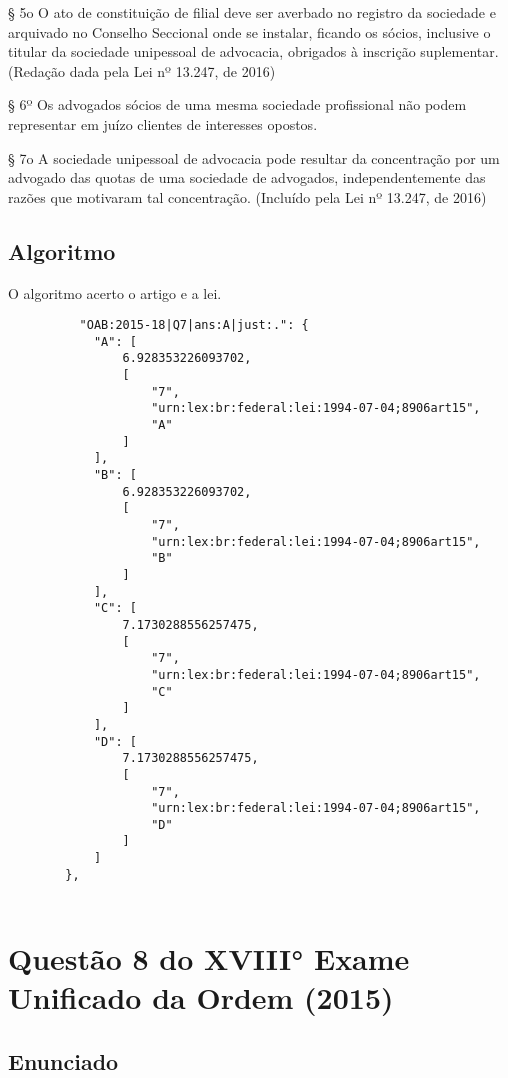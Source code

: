 \documentclass[12pt]{article}
\begin{document}
§ 5o  O ato de constituição de filial deve ser averbado no registro da sociedade e arquivado no Conselho Seccional onde se instalar, ficando os sócios, inclusive o titular da sociedade unipessoal de advocacia, obrigados à inscrição suplementar.              (Redação dada pela Lei nº 13.247, de 2016)

§ 6º Os advogados sócios de uma mesma sociedade profissional não podem representar em juízo clientes de interesses opostos.

§ 7o  A sociedade unipessoal de advocacia pode resultar da concentração por um advogado das quotas de uma sociedade de advogados, independentemente das razões que motivaram tal concentração.             (Incluído pela Lei nº 13.247, de 2016)

\subsection{Algoritmo}

O algoritmo acerto o artigo e a lei.

\begin{lstlisting}
          "OAB:2015-18|Q7|ans:A|just:.": {
            "A": [
                6.928353226093702,
                [
                    "7",
                    "urn:lex:br:federal:lei:1994-07-04;8906art15",
                    "A"
                ]
            ],
            "B": [
                6.928353226093702,
                [
                    "7",
                    "urn:lex:br:federal:lei:1994-07-04;8906art15",
                    "B"
                ]
            ],
            "C": [
                7.1730288556257475,
                [
                    "7",
                    "urn:lex:br:federal:lei:1994-07-04;8906art15",
                    "C"
                ]
            ],
            "D": [
                7.1730288556257475,
                [
                    "7",
                    "urn:lex:br:federal:lei:1994-07-04;8906art15",
                    "D"
                ]
            ]
        },
        
\end{lstlisting}



\section{Questão 8 do XVIII° Exame Unificado da Ordem (2015)}

\subsection{Enunciado}
\end{document}
